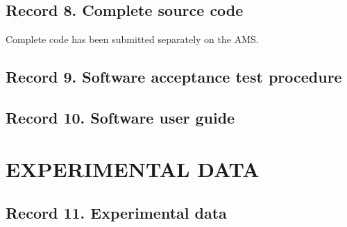 \subsection{Record 8. Complete source code}
Complete code has been submitted separately on the AMS.


\subsection{Record 9. Software acceptance test procedure}


\subsection{Record 10. Software user guide}



\section{EXPERIMENTAL DATA}

\subsection{Record 11. Experimental data}




